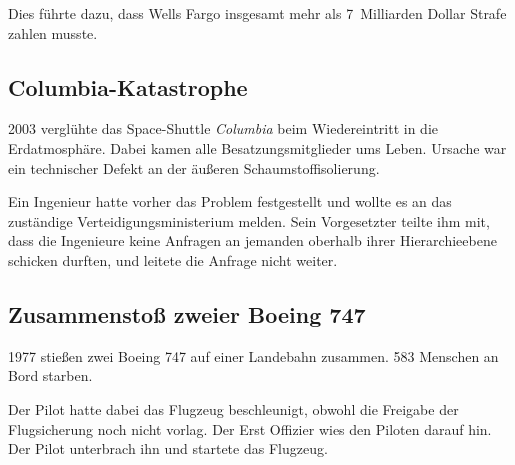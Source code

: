 Dies führte dazu, dass Wells Fargo insgesamt mehr als 7~Milliarden Dollar Strafe zahlen musste.


\subsection{Columbia-Katastrophe}

2003 verglühte das Space-Shuttle \emph{Columbia} beim Wiedereintritt in die Erdatmosphäre. Dabei kamen alle Besatzungsmitglieder ums Leben. Ursache war ein technischer Defekt an der äußeren Schaumstoffisolierung.

Ein Ingenieur hatte vorher das Problem festgestellt und wollte es an das zuständige Verteidigungsministerium melden. Sein Vorgesetzter teilte ihm mit, dass \glqq die Ingenieure keine Anfragen an jemanden oberhalb ihrer Hierarchieebene schicken durften\grqq, und leitete die Anfrage nicht weiter.


\subsection{Zusammenstoß zweier Boeing 747}

1977 stießen zwei Boeing 747 auf einer Landebahn zusammen. 583 Menschen an Bord starben.

Der Pilot hatte dabei das Flugzeug beschleunigt, obwohl die Freigabe der Flugsicherung noch nicht vorlag. Der Erst Offizier wies den Piloten darauf hin. Der Pilot unterbrach ihn und startete das Flugzeug.

